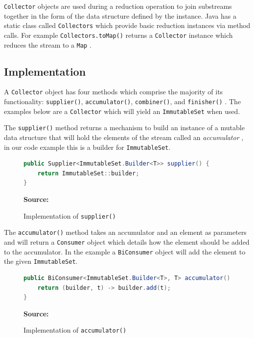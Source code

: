 \documentclass[oneside, 12pt]{article}
\newcommand{\source}[1]{\textbf{Source:} {#1} }
\begin{document}
\verb|Collector| objects are used during a reduction operation to join substreams together in the form of the data structure defined by the instance. Java has a static class called \verb|Collectors| which provide basic reduction instances via method calls. For example \verb|Collectors.toMap()| returns a \verb|Collector| instance which reduces the stream to a \verb|Map| \autocite{collectors_doc}. 

\subsection{Implementation}

A \verb|Collector| object has four methods which comprise the majority of its functionality: \verb|supplier()|, \verb|accumulator()|, \verb|combiner()|, and \verb|finisher()| \autocite{collector_doc}. The examples below are a \verb|Collector| which will yield an \verb|ImmutableSet| when used.

The \verb|supplier()| method returns a mechanism to build an instance of a mutable data structure that will hold the elements of the stream called an \textit{accumulator} \autocite{custom_collector}, in our code example this is a builder for \verb|ImmutableSet|.

\begin{figure}[H]
\centering
\begin{lstlisting}[language=Java]
public Supplier<ImmutableSet.Builder<T>> supplier() {
    return ImmutableSet::builder;
}
\end{lstlisting}
\caption{Implementation of {\tt supplier()}}
\source{\autocite{custom_collector}}
\label{fig:supplier}
\end{figure}

The \verb|accumulator()| method takes an accumulator and an element as parameters and will return a \verb|Consumer| object which details how the element should be added to the accumulator. In the example a \verb|BiConsumer| object will add the element to the given \verb|ImmutableSet|.

\begin{figure}[H]
\centering
\begin{lstlisting}[language=Java]
public BiConsumer<ImmutableSet.Builder<T>, T> accumulator() {
    return (builder, t) -> builder.add(t);
}
\end{lstlisting}
\caption{Implementation of {\tt accumulator()}}
\source{\autocite{custom_collector}}
\label{fig:accumulator}
\end{figure}
\end{document}
